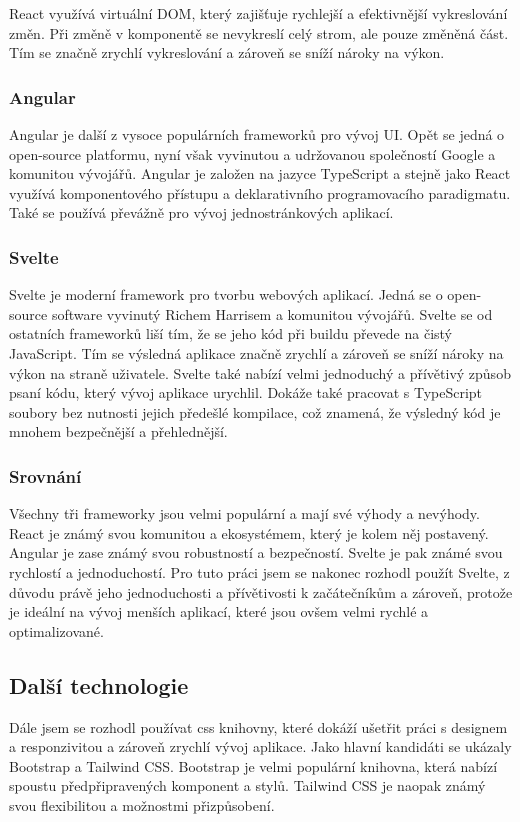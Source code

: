 React využívá virtuální DOM, který zajišťuje rychlejší a efektivnější vykreslování změn. Při změně v komponentě se nevykreslí celý strom, ale pouze změněná část. Tím se značně zrychlí vykreslování a zároveň se sníží nároky na výkon.

\subsubsection{Angular}
Angular je další z vysoce populárních frameworků pro vývoj UI. Opět se jedná o open-source platformu, nyní však vyvinutou a udržovanou společností Google a komunitou vývojářů. Angular je založen na jazyce TypeScript a stejně jako React využívá komponentového přístupu a deklarativního programovacího paradigmatu. Také se používá převážně pro vývoj jednostránkových aplikací.

\subsubsection{Svelte}
Svelte je moderní framework pro tvorbu webových aplikací. Jedná se o open-source software vyvinutý Richem Harrisem a komunitou vývojářů. Svelte se od ostatních frameworků liší tím, že se jeho kód při buildu převede na čistý JavaScript. Tím se výsledná aplikace značně zrychlí a zároveň se sníží nároky na výkon na straně uživatele. Svelte také nabízí velmi jednoduchý a přívětivý způsob psaní kódu, který vývoj aplikace urychlil. Dokáže také pracovat s TypeScript soubory bez nutnosti jejich předešlé kompilace, což znamená, že výsledný kód je mnohem bezpečnější a přehlednější.

\subsubsection{Srovnání}
Všechny tři frameworky jsou velmi populární a mají své výhody a nevýhody. React je známý svou komunitou a ekosystémem, který je kolem něj postavený. Angular je zase známý svou robustností a bezpečností. Svelte je pak známé svou rychlostí a jednoduchostí. Pro tuto práci jsem se nakonec rozhodl použít Svelte, z důvodu právě jeho jednoduchosti a přívětivosti k začátečníkům a zároveň, protože je ideální na vývoj menších aplikací, které jsou ovšem velmi rychlé a optimalizované.

\subsection{Další technologie}
Dále jsem se rozhodl používat css knihovny, které dokáží ušetřit práci s designem a responzivitou a zároveň zrychlí vývoj aplikace. Jako hlavní kandidáti se ukázaly Bootstrap a Tailwind CSS. Bootstrap je velmi populární knihovna, která nabízí spoustu předpřipravených komponent a stylů. Tailwind CSS je naopak známý svou flexibilitou a možnostmi přizpůsobení.